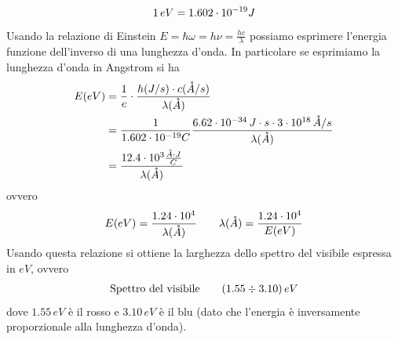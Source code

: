 \documentclass{article}
\begin{document}
\begin{align}
    1 \, eV = 1.602 \cdot 10^{-19} J \notag
\end{align}
Usando la relazione di Einstein $E = \hbar\omega = h\nu = \frac{hc}{\lambda}$ possiamo esprimere l'energia funzione dell'inverso di una lunghezza d'onda. In particolare se esprimiamo la lunghezza d'onda in Angstrom si ha
\begin{align}
    E(eV) &= \frac{1}{e} \cdot \frac{h(J/s) \cdot c(\mathring{A}/s)}{\lambda(\mathring{A})} \notag \\
    &= \frac{1}{1.602 \cdot 10^{-19} C}\frac{6.62 \cdot 10^{-34} \, J\cdot s \cdot 3 \cdot 10^{18} \, \mathring{A}/s}{\lambda(\mathring{A})} \notag \\
    &= \frac{12.4 \cdot 10^3 \frac{\mathring{A} \cdot J}{C}}{\lambda(\mathring{A})} \notag
\end{align}
ovvero
\begin{gather}
    E(eV) = \frac{1.24 \cdot 10^4}{\lambda(\mathring{A})} \qquad \lambda(\mathring{A}) = \frac{1.24 \cdot 10^4}{E(eV)} \notag
\end{gather}
Usando questa relazione si ottiene la larghezza dello spettro del visibile espressa in $eV$, ovvero
\begin{gather}
    \text{Spettro del visibile} \qquad (1.55 \div 3.10) \, eV \notag
\end{gather}
dove $1.55 \, eV$ è il rosso e $3.10 \, eV$ è il blu (dato che l'energia è inversamente proporzionale alla lunghezza d'onda).

\newpage
\end{document}

